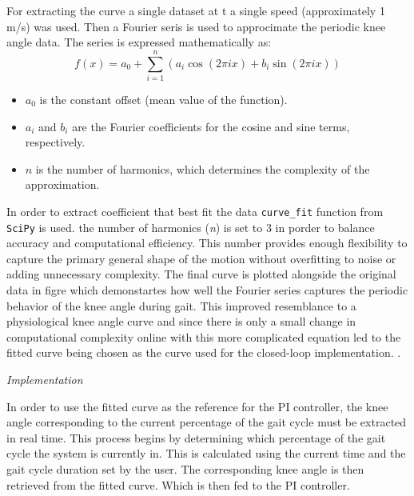 
For extracting the curve a single dataset at t a single speed (approximately 1 m/s) was used. Then a Fourier seris is used to approcimate the periodic knee angle data. The series is expressed mathematically as:
\begin{equation}
f(x) = a_0 + \sum_{i=1}^{n} \left( a_i \cos(2\pi i x) + b_i \sin(2\pi i x) \right)
\end{equation}

\begin{itemize}
    \item \(a_0\) is the constant offset (mean value of the function).
    \item \(a_i\) and \(b_i\) are the Fourier coefficients for the cosine and sine terms, respectively.
    \item \(n\) is the number of harmonics, which determines the complexity of the approximation.
\end{itemize}

In order to extract coefficient that best fit the data \texttt{curve\_fit}  function from \texttt{SciPy} is used. the number of harmonics (\textit{n}) is set to 3 in porder to balance accuracy and computational efficiency. This number provides enough flexibility to capture the primary general shape of the motion without overfitting to noise or adding unnecessary complexity. The  final curve is plotted alongside the original data in figre  which demonstartes how well the Fourier series captures the periodic behavior of the knee angle during gait. This improved resemblance to a physiological knee angle curve and since there is only a small change in computational complexity online with this more complicated equation led to the fitted curve being chosen as the curve used for the closed-loop implementation.
.
\newline

\textit{Implementation}

In order to use the fitted curve as the reference for the PI controller, the knee angle corresponding to the current percentage of the gait cycle must be extracted in real time. This process begins by determining which percentage of the gait cycle the system is currently in. This is calculated using the current time and the gait cycle duration set by the user. The corresponding knee angle is then retrieved from the fitted curve. Which is then fed to the PI controller.

